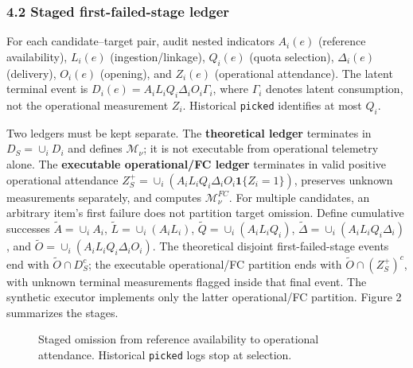 \documentclass[
  11pt]{article}
\begin{document}
\subsubsection{4.2 Staged first-failed-stage
ledger}\label{staged-first-failed-stage-ledger}

For each candidate--target pair, audit nested indicators \(A_i(e)\)
(reference availability), \(L_i(e)\) (ingestion/linkage), \(Q_i(e)\)
(quota selection), \(\Delta_i(e)\) (delivery), \(O_i(e)\) (opening), and
\(Z_i(e)\) (operational attendance). The latent terminal event is
\(D_i(e)=A_iL_iQ_i\Delta_iO_i\Gamma_i\), where \(\Gamma_i\) denotes
latent consumption, not the operational measurement \(Z_i\). Historical
\texttt{picked} identifies at most \(Q_i\).

Two ledgers must be kept separate. The \textbf{theoretical ledger}
terminates in \(D_S=\cup_iD_i\) and defines \(\mathcal M_\nu\); it is
not executable from operational telemetry alone. The \textbf{executable
operational/FC ledger} terminates in valid positive operational
attendance \(Z_S^+=\cup_i(A_iL_iQ_i\Delta_iO_i\mathbf1\{Z_i=1\})\),
preserves unknown measurements separately, and computes
\(\mathcal M_\nu^{FC}\). For multiple candidates, an arbitrary item's
first failure does not partition target omission. Define cumulative
successes \(\widetilde A=\cup_iA_i\), \(\widetilde L=\cup_i(A_iL_i)\),
\(\widetilde Q=\cup_i(A_iL_iQ_i)\),
\(\widetilde\Delta=\cup_i(A_iL_iQ_i\Delta_i)\), and
\(\widetilde O=\cup_i(A_iL_iQ_i\Delta_iO_i)\). The theoretical disjoint
first-failed-stage events end with \(\widetilde O\cap D_S^c\); the
executable operational/FC partition ends with
\(\widetilde O\cap (Z_S^+)^c\), with unknown terminal measurements
flagged inside that final event. The synthetic executor implements only
the latter operational/FC partition. Figure 2 summarizes the stages.

\begin{figure}[htbp]
\centering
{}
\caption{Staged omission from reference availability to operational attendance. Historical \texttt{picked} logs stop at selection.}
\label{fig:omission-stages}
\end{figure}
\end{document}
